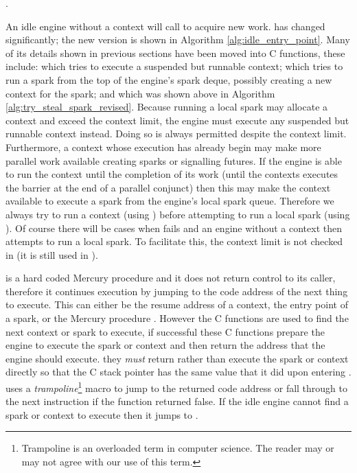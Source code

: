 .

An idle engine without a context will call \idle to acquire new work.
\idle has changed significantly;
the new version is shown in Algorithm \ref{alg:idle_entry_point}.
Many of its details shown in previous sections have been moved into C
functions,
these include:
\tryruncontext which tries to execute a suspended but runnable context;
\tryrunlocalspark which tries to run a spark from the top of the engine's
spark deque, possibly creating a new context for the spark;
and 
\trystealspark which was shown above in Algorithm
\ref{alg:try_steal_spark_revised}.
Because running a local spark may allocate a context and exceed the context
limit,
the engine must execute any suspended but runnable context instead.
Doing so is always permitted despite the context limit.
Furthermore,
a context whose execution has already begin may make more parallel work
available creating sparks or signalling futures.
If the engine is able to run the context until the completion of its work
(until the contexts executes the \joinandcontinue barrier at the end of a
parallel conjunct)
then this may make the context available to execute a spark from the
engine's local spark queue.
Therefore we always try to run a context (using \tryruncontext)
before attempting to run a local spark (using \tryrunlocalspark).
Of course there will be cases when \tryruncontext fails and an engine
without a context then attempts to run a local spark.
To facilitate this, the context limit is not checked in \tryrunlocalspark
(it is still used in \trystealspark).

\idle is a hard coded Mercury procedure and it does not return control to
its caller,
therefore it continues execution by jumping to the code address of the next
thing to execute.
This can either be the resume address of a context,
the entry point of a spark,
or the Mercury procedure \sleep.
However
the C functions are used to find the next context or spark to execute,
if successful these C functions prepare the engine to execute the spark or
context and then return the address that the engine should execute.
they \emph{must} return rather than execute the spark or context directly so
that the C stack pointer has the same value that it did upon entering \idle.
\idle uses a \emph{trampoline}\footnote{
    Trampoline is an overloaded term in computer science.
    The reader may or may not agree with our use of this term.
    }
macro to jump to the returned code
address or fall through to the next instruction if the function returned
false.
If the idle engine cannot find a spark or context to execute then it jumps
to \sleep.


